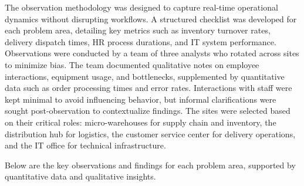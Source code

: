 \documentclass[12pt,a4paper]{article}
\begin{document}
The observation methodology was designed to capture real-time operational dynamics without disrupting workflows. A structured checklist was developed for each problem area, detailing key metrics such as inventory turnover rates, delivery dispatch times, HR process durations, and IT system performance. Observations were conducted by a team of three analysts who rotated across sites to minimize bias. The team documented qualitative notes on employee interactions, equipment usage, and bottlenecks, supplemented by quantitative data such as order processing times and error rates. Interactions with staff were kept minimal to avoid influencing behavior, but informal clarifications were sought post-observation to contextualize findings. The sites were selected based on their critical roles: micro-warehouses for supply chain and inventory, the distribution hub for logistics, the customer service center for delivery operations, and the IT office for technical infrastructure.

Below are the key observations and findings for each problem area, supported by quantitative data and qualitative insights.
\end{document}
